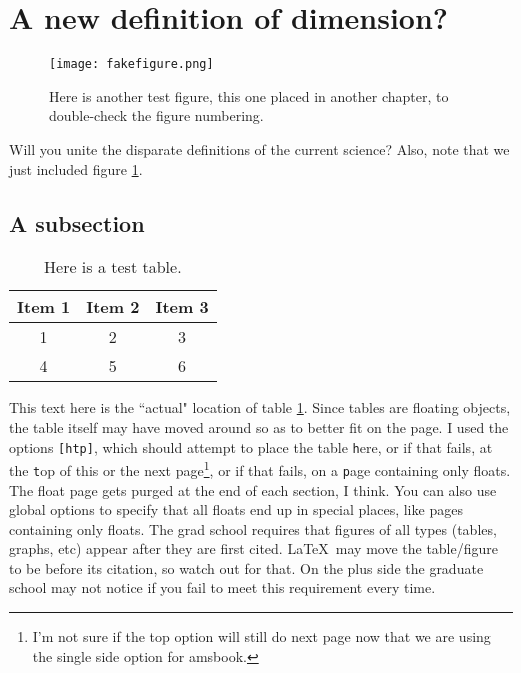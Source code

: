 \documentclass[draft, masters]{csuthesis} %
\begin{document}
\section{A new definition of dimension?}

\begin{figure}
\texttt{[image: fakefigure.png]}
\caption[Test figure in chapter 2]{Here is another test figure, this one placed in another chapter, to double-check the figure numbering.}
\label{fig:newchap}
\end{figure}

Will you unite the disparate definitions of the current science? Also, note that we just included figure \ref{fig:newchap}. \lipsum[1]

\subsection{A subsection}

\begin{table}[htp]
\caption[Test table]{Here is a test table.}
\label{table:faketable}
\begin{tabular}{|c|c|c|}
\hline
Item 1 & Item 2 & Item 3\\
\hline
1 & 2 & 3 \\
4 & 5 & 6 \\
\hline
\end{tabular}
\end{table}

This text here is the ``actual" location of table \ref{table:faketable}.  Since tables are floating objects, the table itself may have moved around so as to better fit on the page.  I used the options \verb-[htp]-, which should attempt to place the table \verb-h-ere, or if that fails, at the \verb-t-op of this or the next page\footnote{I'm not sure if the top option will still do next page now that we are using the single side option for amsbook.}, or if that fails, on a \verb-p-age containing only floats.  The float page gets purged at the end of each section, I think.  You can also use global options to specify that all floats end up in special places, like pages containing only floats.  The grad school requires that figures of all types (tables, graphs, etc) appear after they are first cited.  \LaTeX\ may move the table/figure to be before its citation, so watch out for that.  On the plus side the graduate school may not notice if you fail to meet this requirement every time.
\end{document}
